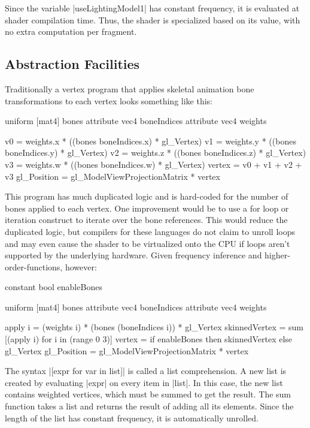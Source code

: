 \documentclass[review]{acmsiggraph}      %
\begin{document}
Since the variable |useLightingModel1| has constant frequency, it is
evaluated at shader compilation time.  Thus, the shader is specialized
based on its value, with no extra computation per fragment.


\subsection{Abstraction Facilities}

Traditionally a vertex program that applies skeletal animation bone
transformations to each vertex looks something like this:

\begin{MyVerb}
uniform [mat4] bones
attribute vec4 boneIndices
attribute vec4 weights

v0 = weights.x * ((bones boneIndices.x) * gl_Vertex)
v1 = weights.y * ((bones boneIndices.y) * gl_Vertex)
v2 = weights.z * ((bones boneIndices.z) * gl_Vertex)
v3 = weights.w * ((bones boneIndices.w) * gl_Vertex)
vertex = v0 + v1 + v2 + v3
gl_Position = gl_ModelViewProjectionMatrix * vertex
\end{MyVerb}

This program has much duplicated logic and is hard-coded for the
number of bones applied to each vertex.  One improvement would be to
use a for loop or iteration construct to iterate over the bone
references.  This would reduce the duplicated logic, but compilers for
these languages do not claim to unroll loops and may even cause the
shader to be virtualized onto the CPU if loops aren't supported by the
underlying hardware.  Given frequency inference and
higher-order-functions, however:

\begin{MyVerb}
constant bool enableBones

uniform [mat4] bones
attribute vec4 boneIndices
attribute vec4 weights

apply i = (weights i) * (bones (boneIndices i))
          * gl_Vertex
skinnedVertex = 
    sum [(apply i) for i in (range 0 3)]
vertex = if enableBones then skinnedVertex else gl_Vertex
gl_Position = gl_ModelViewProjectionMatrix * vertex
\end{MyVerb}


The syntax |[expr for var in list]| is called a list comprehension.  A
new list is created by evaluating |expr| on every item in |list|.  In
this case, the new list contains weighted vertices, which must be
summed to get the result.  The sum function takes a list and returns
the result of adding all its elements.  Since the length of the list
has constant frequency, it is automatically unrolled.
\end{document}
